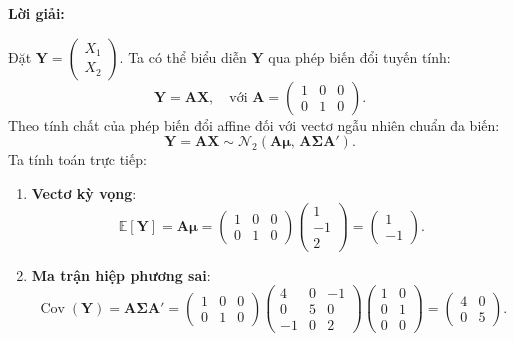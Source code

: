 \documentclass[11pt,a4paper]{article}
\newenvironment{solution}{%
  \par\noindent\textbf{Lời giải:}\ \ignorespaces
}{\par}
\theoremstyle{definition}
\begin{document}
\begin{solution}
Đặt $\mathbf{Y} = \begin{pmatrix} X_1 \\ X_2 \end{pmatrix}$. Ta có thể biểu diễn $\mathbf{Y}$ qua phép biến đổi tuyến tính:
\[
\mathbf{Y} = \mathbf{A}\mathbf{X}, \quad \text{với } \mathbf{A} = \begin{pmatrix} 1 & 0 & 0 \\ 0 & 1 & 0 \end{pmatrix}.
\]
Theo tính chất của phép biến đổi affine đối với vectơ ngẫu nhiên chuẩn đa biến:
\[
\mathbf{Y} = \mathbf{A}\mathbf{X} \sim \mathcal{N}_2\left(\mathbf{A}\boldsymbol{\mu}, \, \mathbf{A}\boldsymbol{\Sigma}\mathbf{A}'\right).
\]
Ta tính toán trực tiếp:
\begin{enumerate}[label=\alph*)]
  \item \textbf{Vectơ kỳ vọng}:
  \[
  \mathbb{E}[\mathbf{Y}] = \mathbf{A}\boldsymbol{\mu} = \begin{pmatrix} 1 & 0 & 0 \\ 0 & 1 & 0 \end{pmatrix} \begin{pmatrix} 1 \\ -1 \\ 2 \end{pmatrix} = \begin{pmatrix} 1 \\ -1 \end{pmatrix}.
  \]
  
  \item \textbf{Ma trận hiệp phương sai}:
  \[
  \operatorname{Cov}(\mathbf{Y}) = \mathbf{A}\boldsymbol{\Sigma}\mathbf{A}' = \begin{pmatrix} 1 & 0 & 0 \\ 0 & 1 & 0 \end{pmatrix} \begin{pmatrix} 4 & 0 & -1 \\ 0 & 5 & 0 \\ -1 & 0 & 2 \end{pmatrix} \begin{pmatrix} 1 & 0 \\ 0 & 1 \\ 0 & 0 \end{pmatrix} = \begin{pmatrix} 4 & 0 \\ 0 & 5 \end{pmatrix}.
  \]
\end{enumerate}


\end{solution}
\end{document}
